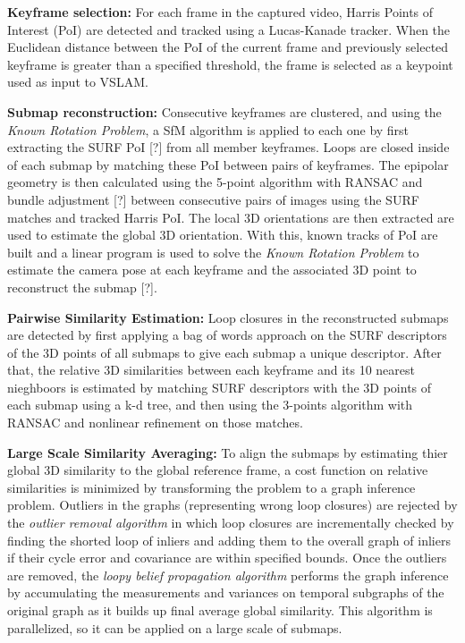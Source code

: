 \documentclass[10pt,twocolumn,letterpaper]{article}
\begin{document}
\textbf{Keyframe selection:} For each frame in the captured video, Harris Points of Interest 
(PoI) are detected and tracked using a Lucas-Kanade tracker.  When the Euclidean distance between 
the PoI of the current frame and previously selected keyframe is greater than a specified threshold, the 
frame is selected as a keypoint used as input to VSLAM.

\textbf{Submap reconstruction:} Consecutive keyframes are clustered, and using the 
\textit{Known Rotation Problem}, a SfM algorithm is applied to each one by first extracting the SURF 
PoI [?] from all member keyframes. Loops are closed inside of each submap by 
matching these PoI between pairs of keyframes. The epipolar geometry is then calculated 
using the 5-point algorithm with RANSAC and bundle adjustment [?] between consecutive pairs of images 
using the SURF matches and tracked Harris PoI. The local 3D orientations are then extracted are used to 
estimate the global 3D orientation. With this, known tracks of PoI are built and 
a linear program is used to solve the \textit{Known Rotation Problem} to estimate the camera pose at each 
keyframe and the associated 3D point to reconstruct the submap [?].

\textbf{Pairwise Similarity Estimation:} Loop closures in the reconstructed submaps are 
detected by first applying a bag of words approach on the SURF descriptors of the 3D 
points of all submaps to give each submap a unique descriptor.  After that, the relative 
3D similarities between each keyframe and its 10 nearest nieghboors is estimated by 
matching SURF descriptors with the 3D points of each submap using a k-d tree, 
and then using the 3-points algorithm with RANSAC and nonlinear refinement on 
those matches.

\textbf{Large Scale Similarity Averaging:} To align the submaps by 
estimating thier global 3D similarity to the global reference frame, a cost function on relative 
similarities is minimized by transforming the problem to a graph inference problem.  
Outliers in the graphs (representing wrong loop closures) are rejected by the 
\textit{outlier removal algorithm} in which loop closures are incrementally checked 
by finding the shorted loop of inliers and adding them to the overall graph of inliers 
if their cycle error and covariance are within specified bounds.  
Once the outliers are removed, the \textit{loopy belief propagation algorithm} performs the 
graph inference by accumulating the measurements and variances on temporal 
subgraphs of the original graph as it builds up final average global similarity. 
This algorithm is parallelized, so it can be applied on a large scale of submaps.
\end{document}
